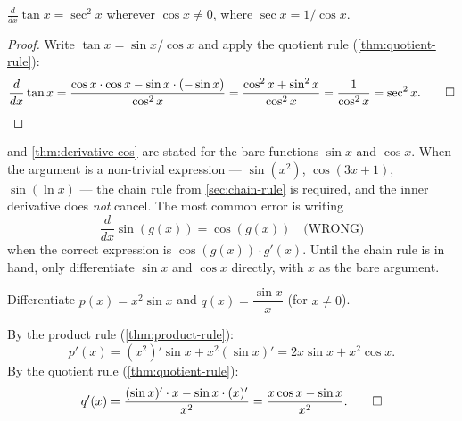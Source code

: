 \begin{corollary}\label{cor:derivative-tan}
\(\displaystyle \frac{d}{dx} \tan x = \sec^{2} x\) wherever \(\cos x \neq 0\), where \(\sec x = 1/\cos x\).
\end{corollary}

\begin{proof}
Write \(\tan x = \sin x / \cos x\) and apply the quotient rule (\cref{thm:quotient-rule}):
\[
\frac{d}{dx} \tan x
= \frac{\cos x \cdot \cos x - \sin x \cdot (-\sin x)}{\cos^{2} x}
= \frac{\cos^{2} x + \sin^{2} x}{\cos^{2} x}
= \frac{1}{\cos^{2} x}
= \sec^{2} x. \qedhere
\]
\end{proof}

\begin{caution}
 and \cref{thm:derivative-cos} are stated for the bare functions \(\sin x\) and \(\cos x\). When the argument is a non-trivial expression --- \(\sin(x^{2})\), \(\cos(3x + 1)\), \(\sin(\ln x)\) --- the chain rule from \cref{sec:chain-rule} is required, and the inner derivative does \emph{not} cancel. The most common error is writing
\[
\frac{d}{dx} \sin(g(x)) = \cos(g(x)) \quad \text{(WRONG)}
\]
when the correct expression is \(\cos(g(x)) \cdot g'(x)\). Until the chain rule is in hand, only differentiate \(\sin x\) and \(\cos x\) directly, with \(x\) as the bare argument.
\end{caution}

\begin{workedexample}
\begin{example}\label{ex:trig-product}
Differentiate \(p(x) = x^{2} \sin x\) and \(q(x) = \dfrac{\sin x}{x}\) (for \(x \neq 0\)).
\end{example}

\begin{solution}
By the product rule (\cref{thm:product-rule}):
\[
p'(x) = (x^{2})' \sin x + x^{2} (\sin x)' = 2x \sin x + x^{2} \cos x.
\]
By the quotient rule (\cref{thm:quotient-rule}):
\[
q'(x) = \frac{(\sin x)' \cdot x - \sin x \cdot (x)'}{x^{2}} = \frac{x \cos x - \sin x}{x^{2}}. \qedhere
\]
\end{solution}
\end{workedexample}


